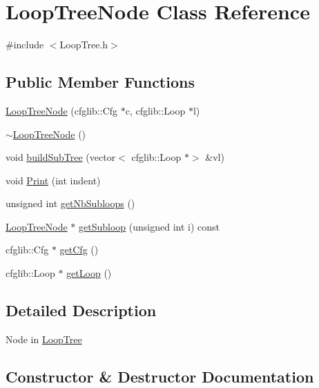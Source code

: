 \hypertarget{classLoopTreeNode}{}\section{Loop\+Tree\+Node Class Reference}
\label{classLoopTreeNode}


{\ttfamily \#include $<$Loop\+Tree.\+h$>$}

\subsection*{Public Member Functions}
\begin{DoxyCompactItemize}
\item 
\hyperlink{classLoopTreeNode_a9cf7ff3a8c001eff75fe21103bbee900}{Loop\+Tree\+Node} (cfglib\+::\+Cfg $\ast$c, cfglib\+::\+Loop $\ast$l)
\item 
\hyperlink{classLoopTreeNode_a4fc6822a2464d24381991e002c2342cf}{$\sim$\+Loop\+Tree\+Node} ()
\item 
void \hyperlink{classLoopTreeNode_a2c627285512cf63318c83ee13eaf9acc}{build\+Sub\+Tree} (vector$<$ cfglib\+::\+Loop $\ast$$>$ \&vl)
\item 
void \hyperlink{classLoopTreeNode_a8a4e5bfb9d89feecd9d2312073b40d64}{Print} (int indent)
\item 
unsigned int \hyperlink{classLoopTreeNode_a07dd9ae4f13832ed75509ccd1e4f0d7e}{get\+Nb\+Subloops} ()
\item 
\hyperlink{classLoopTreeNode}{Loop\+Tree\+Node} $\ast$ \hyperlink{classLoopTreeNode_ad2e1b8b9da0256da5bd7c77c84d4a414}{get\+Subloop} (unsigned int i) const
\item 
cfglib\+::\+Cfg $\ast$ \hyperlink{classLoopTreeNode_a6675cdf0a28839ac371f69a944075e10}{get\+Cfg} ()
\item 
cfglib\+::\+Loop $\ast$ \hyperlink{classLoopTreeNode_a82af2d4ae41d1cc470fa811c7051f818}{get\+Loop} ()
\end{DoxyCompactItemize}


\subsection{Detailed Description}
Node in \hyperlink{classLoopTree}{Loop\+Tree} 

\subsection{Constructor \& Destructor Documentation}
\mbox{\label{classLoopTreeNode_a9cf7ff3a8c001eff75fe21103bbee900}} 
